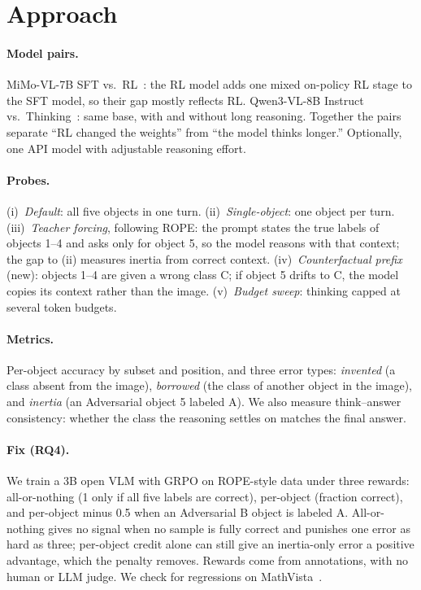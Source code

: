 \documentclass[11pt]{article}
\begin{document}
\section{Approach}

\paragraph{Model pairs.} MiMo-VL-7B SFT vs.\ RL~\citep{mimovl2025}: the RL model adds one mixed on-policy RL stage to the SFT model, so their gap mostly reflects RL. Qwen3-VL-8B Instruct vs.\ Thinking~\citep{bai2025qwen3vl}: same base, with and without long reasoning. Together the pairs separate ``RL changed the weights'' from ``the model thinks longer.'' Optionally, one API model with adjustable reasoning effort.

\paragraph{Probes.} (i)~\emph{Default}: all five objects in one turn. (ii)~\emph{Single-object}: one object per turn. (iii)~\emph{Teacher forcing}, following ROPE: the prompt states the true labels of objects 1--4 and asks only for object 5, so the model reasons with that context; the gap to (ii) measures inertia from correct context. (iv)~\emph{Counterfactual prefix} (new): objects 1--4 are given a wrong class C; if object 5 drifts to C, the model copies its context rather than the image. (v)~\emph{Budget sweep}: thinking capped at several token budgets.

\paragraph{Metrics.} Per-object accuracy by subset and position, and three error types: \emph{invented} (a class absent from the image), \emph{borrowed} (the class of another object in the image), and \emph{inertia} (an Adversarial object 5 labeled A). We also measure think--answer consistency: whether the class the reasoning settles on matches the final answer.

\paragraph{Fix (RQ4).} We train a 3B open VLM with GRPO on ROPE-style data under three rewards: all-or-nothing (1 only if all five labels are correct), per-object (fraction correct), and per-object minus 0.5 when an Adversarial B object is labeled A. All-or-nothing gives no signal when no sample is fully correct and punishes one error as hard as three; per-object credit alone can still give an inertia-only error a positive advantage, which the penalty removes. Rewards come from annotations, with no human or LLM judge. We check for regressions on MathVista~\citep{lu2024mathvista}.
\end{document}
